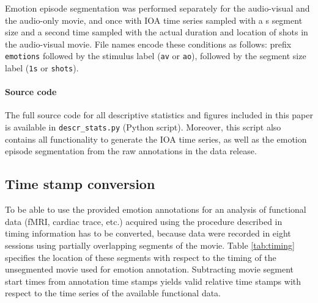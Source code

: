 Emotion episode segmentation was performed separately for the audio-visual and
the audio-only movie, and once with IOA time series sampled with a \unit[1]{s}
segment size and a second time sampled with the actual duration and location of
shots in the audio-visual movie. File names encode these conditions as follows:
prefix \texttt{emotions} followed by the stimulus label (\texttt{av} or
\texttt{ao}), followed by the segment size label (\texttt{1s} or
\texttt{shots}).


\paragraph{Source code}

The full source code for all descriptive statistics and figures included in
this paper is available in \texttt{descr\_stats.py} (Python script). Moreover,
this script also contains all functionality to generate the IOA time series, as
well as the emotion episode segmentation from the raw annotations in the data
release.


\subsection*{Time stamp conversion}

To be able to use the provided emotion annotations for an analysis of
functional data (fMRI, cardiac trace, etc.) acquired using the
procedure described in~\cite{HBI+14} timing information has to be converted,
because data were recorded in eight sessions using partially overlapping
segments of the movie. Table \ref{tab:timing} specifies the location of these
segments with respect to the timing of the unsegmented movie used for emotion
annotation. Subtracting movie segment start times from annotation time stamps
yields valid relative time stamps with respect to the time series of the
available functional data.

